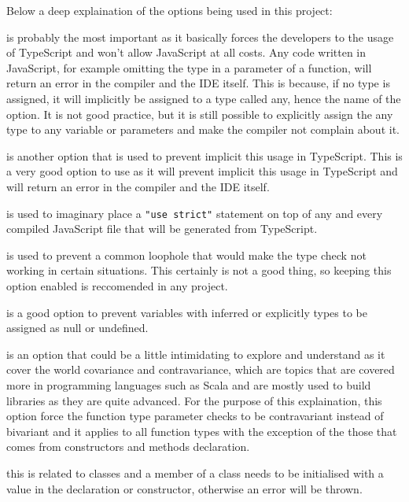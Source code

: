 \begin{description}
  \item Below a deep explaination of the options being used in this project:
  \item [noImplicitAny:] is probably the most important as it basically forces
  the developers to the usage of TypeScript and won't allow JavaScript at all
  costs. Any code written in JavaScript, for example omitting the type in a
  parameter of a function, will return an error in the compiler and the IDE
  itself. This is because, if no type is assigned, it will implicitly be
  assigned to a type called any, hence the name of the option. It is not good
  practice, but it is still possible to explicitly assign the any type to any
  variable or parameters and make the compiler not complain about it.
  \item [noImplicitThis:] is another option that is used to prevent implicit
  this usage in TypeScript. This is a very good option to use as it will prevent
  implicit this usage in TypeScript and will return an error in the compiler and
  the IDE itself.
  \item [alwaysStrict:] is used to imaginary place a \texttt{"use strict"}
  statement on top of any and every compiled JavaScript file that will be
  generated from TypeScript.
  \item [strictBindCallApply:] is used to prevent a common loophole that would
  make the type check not working in certain situations. This certainly is not a
  good thing, so keeping this option enabled is reccomended in any project.
  \item [strictNullChecks:] is a good option to prevent variables with
  inferred or explicitly types to be assigned as null or undefined.
  \item [strictFunctionTypes:] is an option that could be a little
  intimidating to explore and understand as it cover the world covariance and
  contravariance, which are topics that are covered more in programming
  languages such as Scala and are mostly used to build libraries as they are
  quite advanced. For the purpose of this explaination, this option force the
  function type parameter checks to be contravariant instead of bivariant and it
  applies to all function types with the exception of the those that comes from
  constructors and methods declaration.
  \item [strictPropertyInitialization:] this is related to classes and a
  member of a class needs to be initialised with a value in the declaration or
  constructor, otherwise an error will be thrown.
\end{description}

